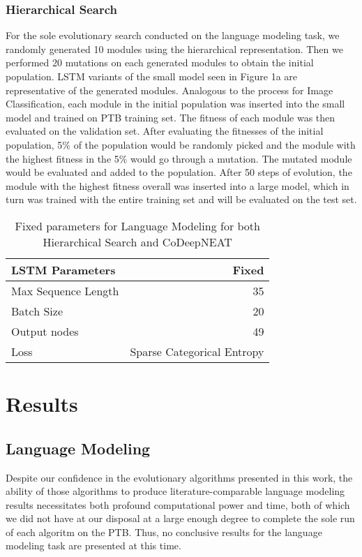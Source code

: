 \documentclass[11pt]{article}
\begin{document}
\subsubsection{Hierarchical Search}
For the sole evolutionary search conducted on the language modeling task, we randomly generated 10 modules using the hierarchical representation. Then we performed 20 mutations on each generated modules to obtain the initial population. LSTM variants of the small model seen in Figure 1a are representative of the generated modules. Analogous to the process for Image Classification, each module in the initial population was inserted into the small model and trained on PTB training set. The fitness of each module was then evaluated on the validation set. After evaluating the fitnesses of the initial population, 5$\%$ of the population would be randomly picked and the module with the highest fitness in the 5$\%$ would go through a mutation. The mutated module would be evaluated and added to the population. After 50 steps of evolution, the module with the highest fitness overall was inserted into a large model, which in turn was trained with the entire training set and will be evaluated on the test set. \\

\begin{table}[h]
\begin{center}
\begin{tabular}{|l|r|} \hline
{\bf LSTM Parameters} & {\bf Fixed} \\ \hline
Max Sequence Length & 35 \\
Batch Size & 20 \\
Output nodes & 49 \\
Loss & Sparse Categorical Entropy \\ \hline
\end{tabular}
\caption{Fixed parameters for Language Modeling for both Hierarchical Search and CoDeepNEAT}
\end{center}
\end{table}


\section{Results}

\subsection{Language Modeling}
Despite our confidence in the evolutionary algorithms presented in this work, the ability of those algorithms to produce literature-comparable language modeling results necessitates both profound computational power and time, both of which we did not have at our disposal at a large enough degree to complete the sole run of each algoritm on the PTB. Thus, no conclusive results for the language modeling task are presented at this time.\\ 
\end{document}
